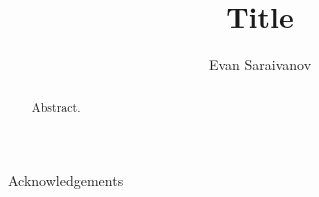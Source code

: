 \documentclass[master,bottom,nosig]{usbthesis}
\author{Evan Saraivanov}%
\title{Title}%
\theoremstyle{definition}
\theoremstyle{plain} %
\begin{document}
\singlespacing %
\maketitle %
\makeapproval %

\begin{abstract}
Abstract.
\end{abstract}
\tableofcontents %
\listoffigures %
%
%
\begin{acknowledgements}
Acknowledgements
\end{acknowledgements}
\pagestyle{thesis}
\newpage
{}







{}
\renewcommand{\baselinestretch}{1}
\normalsize

\clearpage
\newpage
{}%
%


\clearpage
\newpage

\appendix

%
\end{document}
